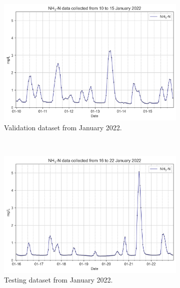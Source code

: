 \begin{figure}[!ht]
  \centering
  \begin{subfigure}[t]{0.6\textwidth}
    \includegraphics[width=\linewidth]{imgs/results/heterogeneity-validation.png}
    \caption{Validation dataset from January 2022.} \label{fig:valid-data}
  \end{subfigure}\\
  \begin{subfigure}[t]{0.6\textwidth}
    \includegraphics[width=\linewidth]{imgs/results/heterogeneity-jan-test.png}
    \caption{Testing dataset from January 2022.} \label{fig:jan-test-data}
  \end{subfigure}\\
  \begin{subfigure}[t]{0.6\textwidth}

\end{subfigure}
\end{figure}
